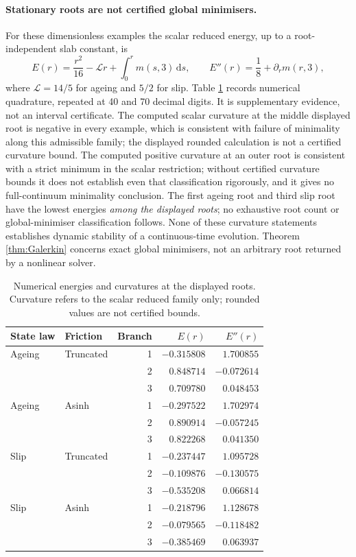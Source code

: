 \documentclass[11pt,a4paper]{article}
\theoremstyle{definition}\newtheorem{definition}[theorem]{Definition}
\theoremstyle{remark}\newtheorem{remark}[theorem]{Remark}
\newcommand{\dd}{\,\mathrm d}
\numberwithin{equation}{section}
\begin{document}
\paragraph{Stationary roots are not certified global minimisers.}
For these dimensionless examples the scalar reduced energy, up to a root-independent slab constant, is
\begin{equation}\label{eq:scalarenergy}
 E(r)=\frac{r^2}{16}-\mathcal Lr+\int_0^r m(s,3)\dd s,
 \qquad E''(r)=\frac18+\partial_rm(r,3),
\end{equation}
where $\mathcal L=14/5$ for ageing and $5/2$ for slip. Table \ref{tab:rootenergy} records numerical quadrature, repeated at 40 and 70 decimal digits. It is supplementary evidence, not an interval certificate. The computed scalar curvature at the middle displayed root is negative in every example, which is consistent with failure of minimality along this admissible family; the displayed rounded calculation is not a certified curvature bound. The computed positive curvature at an outer root is consistent with a strict minimum in the scalar restriction; without certified curvature bounds it does not establish even that classification rigorously, and it gives no full-continuum minimality conclusion. The first ageing root and third slip root have the lowest energies \emph{among the displayed roots}; no exhaustive root count or global-minimiser classification follows. None of these curvature statements establishes dynamic stability of a continuous-time evolution. Theorem \ref{thm:Galerkin} concerns exact global minimisers, not an arbitrary root returned by a nonlinear solver.
\begin{table}[ht]
\centering\small
\caption{Numerical energies and curvatures at the displayed roots. Curvature refers to the scalar reduced family only; rounded values are not certified bounds.}\label{tab:rootenergy}
\begin{tabular}{llrrr}\toprule
State law & Friction & Branch & $E(r)$ & $E''(r)$\\\midrule
Ageing & Truncated & 1 & $-0.315808$ & $1.700855$\\
 &  & 2 & $0.848714$ & $-0.072614$\\
 &  & 3 & $0.709780$ & $0.048453$\\
Ageing & Asinh & 1 & $-0.297522$ & $1.702974$\\
 &  & 2 & $0.890914$ & $-0.057245$\\
 &  & 3 & $0.822268$ & $0.041350$\\
Slip & Truncated & 1 & $-0.237447$ & $1.095728$\\
 &  & 2 & $-0.109876$ & $-0.130575$\\
 &  & 3 & $-0.535208$ & $0.066814$\\
Slip & Asinh & 1 & $-0.218796$ & $1.128678$\\
 &  & 2 & $-0.079565$ & $-0.118482$\\
 &  & 3 & $-0.385469$ & $0.063937$\\
\bottomrule\end{tabular}
\end{table}
\end{document}
